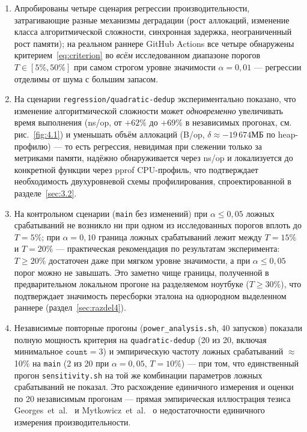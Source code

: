 \begin{enumerate}
\item Апробированы четыре сценария регрессии производительности,
затрагивающие разные механизмы деградации (рост аллокаций, изменение
класса алгоритмической сложности, синхронная задержка, неограниченный
рост памяти); на реальном раннере GitHub Actions все четыре обнаружены
критерием~\eqref{eq:criterion} во \emph{всём} исследованном диапазоне
порогов $T \in [5\%, 50\%]$ при самом строгом уровне значимости
$\alpha=0{,}01$ — регрессии отделимы от шума с большим запасом.
\item На сценарии \texttt{regression/\allowbreak quadratic-dedup} экспериментально
показано, что изменение алгоритмической сложности может \emph{одновременно}
увеличивать время выполнения (ns/op, от $+62\%$ до $+69\%$ в независимых
прогонах, см. рис.~\ref{fig:4.1}) и уменьшать объём аллокаций (B/op,
$\delta \approx -19\,674$МБ по heap-профилю) — то есть
регрессия, невидимая при слежении только за метриками памяти, надёжно
обнаруживается через ns/op и локализуется до конкретной функции через
pprof CPU-профиль, что подтверждает необходимость двухуровневой схемы
профилирования, спроектированной в разделе~\ref{sec:3.2}.
\item На контрольном сценарии (\texttt{main} без изменений) при
$\alpha \le 0{,}05$ ложных срабатываний не возникло ни при одном из
исследованных порогов вплоть до $T=5\%$; при $\alpha=0{,}10$ граница
ложных срабатываний лежит между $T=15\%$ и $T=20\%$ — практическая
рекомендация по результатам эксперимента: $T \ge 20\%$ достаточен даже
при мягком уровне значимости, а при $\alpha \le 0{,}05$ порог можно не
завышать. Это заметно чище границы, полученной в предварительном
локальном прогоне на разделяемом ноутбуке ($T \ge 30\%$), что подтверждает
значимость пересборки эталона на однородном выделенном раннере
(раздел~\ref{sec:razdel4}).
\item Независимые повторные прогоны (\texttt{power\_analysis.sh}, 40
запусков) показали полную мощность критерия на \texttt{quadratic-dedup}
(20 из 20, включая минимальное $\texttt{count}=3$) и эмпирическую частоту
ложных срабатываний $\approx$10\% на \texttt{main} (2 из 20 при
$\alpha=0{,}05$, $T=10\%$) — при том, что единственный прогон
\texttt{sensitivity.sh} на той же комбинации параметров ложных
срабатываний не показал. Это расхождение единичного измерения и оценки по
20 независимым прогонам — прямая эмпирическая иллюстрация тезиса
Georges~et~al.~\cite{georges2007} и Mytkowicz~et~al.~\cite{mytkowicz2009}
о недостаточности единичного измерения производительности.

\end{enumerate}
